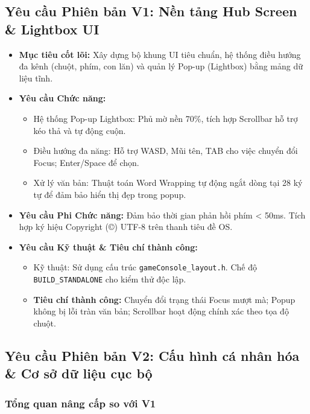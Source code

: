 \documentclass[12pt,a4paper]{article}
\begin{document}
\subsection{Yêu cầu Phiên bản V1: Nền tảng Hub Screen \& Lightbox UI}
\begin{itemize}[leftmargin=*]
    \item \textbf{Mục tiêu cốt lõi:} Xây dựng bộ khung UI tiêu chuẩn, hệ thống điều hướng đa kênh (chuột, phím, con lăn) và quản lý Pop-up (Lightbox) bằng mảng dữ liệu tĩnh.
    \item \textbf{Yêu cầu Chức năng:}
    \begin{itemize}[noitemsep]
        \item Hệ thống Pop-up Lightbox: Phủ mờ nền 70\%, tích hợp Scrollbar hỗ trợ kéo thả và tự động cuộn.
        \item Điều hướng đa năng: Hỗ trợ WASD, Mũi tên, TAB cho việc chuyển đổi Focus; Enter/Space để chọn.
        \item Xử lý văn bản: Thuật toán Word Wrapping tự động ngắt dòng tại 28 ký tự để đảm bảo hiển thị đẹp trong popup.
    \end{itemize}
    \item \textbf{Yêu cầu Phi Chức năng:} Đảm bảo thời gian phản hồi phím < 50ms. Tích hợp ký hiệu Copyright (©) UTF-8 trên thanh tiêu đề OS.
    \item \textbf{Yêu cầu Kỹ thuật \& Tiêu chí thành công:}
    \begin{itemize}[noitemsep]
        \item Kỹ thuật: Sử dụng cấu trúc \texttt{gameConsole\_layout.h}. Chế độ \texttt{BUILD\_STANDALONE} cho kiểm thử độc lập.
        \item \textbf{Tiêu chí thành công:} Chuyển đổi trạng thái Focus mượt mà; Popup không bị lỗi tràn văn bản; Scrollbar hoạt động chính xác theo tọa độ chuột.
    \end{itemize}
\end{itemize}


\subsection{Yêu cầu Phiên bản V2: Cấu hình cá nhân hóa \& Cơ sở dữ liệu cục bộ}

\subsubsection{Tổng quan nâng cấp so với V1}
\end{document}
